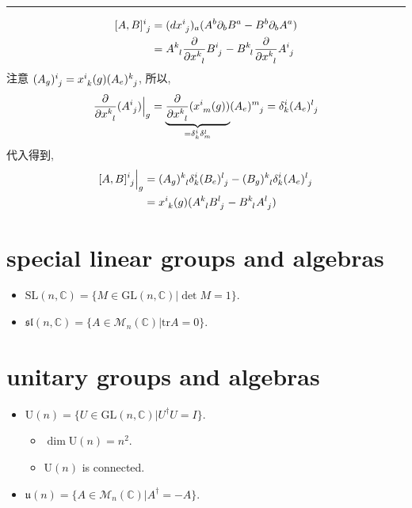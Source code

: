\begin{itemize}
\begin{tcolorbox}[title=proof:]
		\noindent\rule[0.5ex]{\linewidth}{0.5pt} %
		
		\begin{align}
			\tensor{[A, B]}{^i_j} &= (d\tensor{x}{^i_j})_a (A^b \partial_b B^a - B^b \partial_b A^a) \notag \\
			&= \tensor{A}{^k_l} \frac{\partial}{\partial \tensor{x}{^k_l}} \tensor{B}{^i_j} - \tensor{B}{^k_l} \frac{\partial}{\partial \tensor{x}{^k_l}} \tensor{A}{^i_j}
		\end{align}
		注意 $\tensor{(A_g)}{^i_j} = \tensor{x}{^i_k}(g) \tensor{(A_e)}{^k_j}$, 所以,
		\begin{equation}
			\frac{\partial}{\partial \tensor{x}{^k_l}} (\tensor{A}{^i_j}) \Big|_g = \underbrace{\frac{\partial}{\partial \tensor{x}{^k_l}} (\tensor{x}{^i_m}(g))}_{= \delta^i_k \delta^l_m} \tensor{(A_e)}{^m_j} = \delta^i_k \tensor{(A_e)}{^l_j}
		\end{equation}
		代入得到,
		\begin{align}
			\tensor{[A, B]}{^i_j} \Big|_g &= \tensor{(A_g)}{^k_l} \delta^i_k \tensor{(B_e)}{^l_j} - \tensor{(B_g)}{^k_l} \delta^i_k \tensor{(A_e)}{^l_j} \notag \\
			&= \tensor{x}{^i_k}(g) (\tensor{A}{^k_l} \tensor{B}{^l_j} - \tensor{B}{^k_l} \tensor{A}{^l_j})
		\end{align}
	\end{tcolorbox}
\end{itemize}

\section{special linear groups and algebras}
\begin{itemize}
	\item $\mathrm{SL}(n, \mathbb{C}) = \{M \in \mathrm{GL}(n, \mathbb{C}) | \det M = 1\}$.
	
	\item $\mathfrak{sl}(n, \mathbb{C}) = \{A \in \mathcal{M}_n(\mathbb{C}) | \mathrm{tr} A = 0\}$.
\end{itemize}

\section{unitary groups and algebras}
\begin{itemize}
	\item $\mathrm{U}(n) = \{U \in \mathrm{GL}(n, \mathbb{C}) | U^\dag U = I\}$.
	\begin{itemize}
		\item $\dim \mathrm{U}(n) = n^2$.
		
		\item $\mathrm{U}(n)$ is connected.
	\end{itemize}
	
	\item $\mathfrak{u}(n) = \{A \in \mathcal{M}_n(\mathbb{C}) | A^\dag = - A\}$.
\end{itemize}

